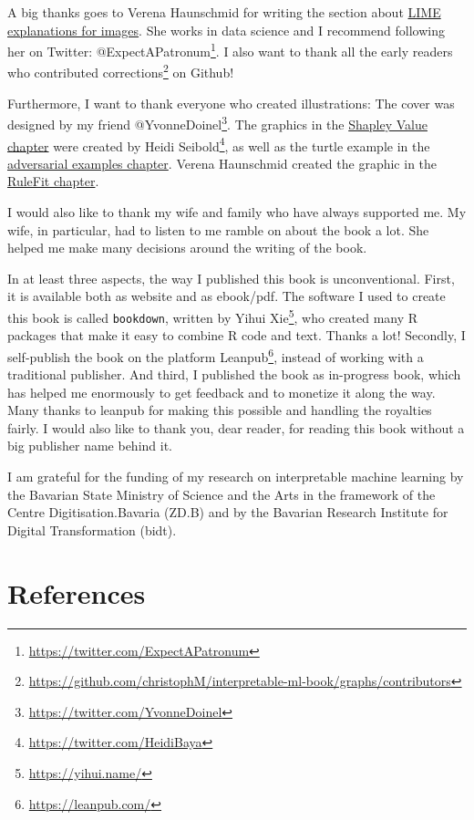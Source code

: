 \documentclass[
  12pt,
]{krantz}
\renewcommand{\href}[2]{#2\footnote{\url{#1}}}
\begin{document}
A big thanks goes to Verena Haunschmid for writing the section about \protect\hyperlink{images-lime}{LIME explanations for images}.
She works in data science and I recommend following her on Twitter: \href{https://twitter.com/ExpectAPatronum}{@ExpectAPatronum}.
I also want to thank all the \href{https://github.com/christophM/interpretable-ml-book/graphs/contributors}{early readers who contributed corrections} on Github!

Furthermore, I want to thank everyone who created illustrations:
The cover was designed by my friend \href{https://twitter.com/YvonneDoinel}{@YvonneDoinel}.
The graphics in the \protect\hyperlink{shapley}{Shapley Value chapter} were created by \href{https://twitter.com/HeidiBaya}{Heidi Seibold}, as well as the turtle example in the \protect\hyperlink{adversarial}{adversarial examples chapter}.
Verena Haunschmid created the graphic in the \protect\hyperlink{rulefit}{RuleFit chapter}.

I would also like to thank my wife and family who have always supported me.
My wife, in particular, had to listen to me ramble on about the book a lot.
She helped me make many decisions around the writing of the book.

In at least three aspects, the way I published this book is unconventional.
First, it is available both as website and as ebook/pdf.
The software I used to create this book is called \texttt{bookdown}, written by \href{https://yihui.name/}{Yihui Xie}, who created many R packages that make it easy to combine R code and text.
Thanks a lot!
Secondly, I self-publish the book on the platform \href{https://leanpub.com/}{Leanpub}, instead of working with a traditional publisher.
And third, I published the book as in-progress book, which has helped me enormously to get feedback and to monetize it along the way.
Many thanks to leanpub for making this possible and handling the royalties fairly.
I would also like to thank you, dear reader, for reading this book without a big publisher name behind it.

I am grateful for the funding of my research on interpretable machine learning by the Bavarian State Ministry of Science and the Arts in the framework of the Centre Digitisation.Bavaria (ZD.B) and by the Bavarian Research Institute for Digital Transformation (bidt).

\hypertarget{references}{%
\chapter*{References}\label{references}}
\end{document}
